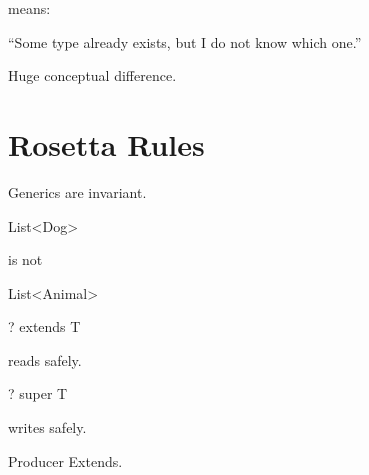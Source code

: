 \documentclass[11pt,a4paper]{book}
\begin{document}

means:


``Some type already exists,
but I do not know which one.''


Huge conceptual difference.


\section{Rosetta Rules}

\begin{rosettarule}

Generics are invariant.

\end{rosettarule}


\begin{rosettarule}

List<Dog>

is not

List<Animal>

\end{rosettarule}


\begin{rosettarule}

? extends T

reads safely.

\end{rosettarule}


\begin{rosettarule}

? super T

writes safely.

\end{rosettarule}


\begin{rosettarule}

Producer Extends.

\end{rosettarule}
\end{document}
